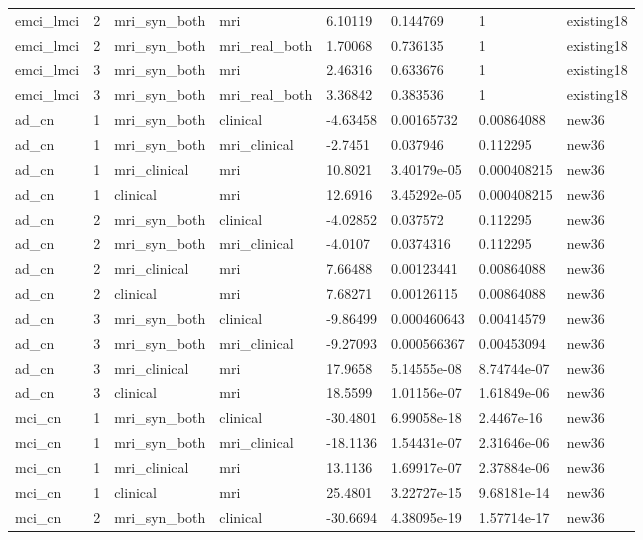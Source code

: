 \documentclass{article}
\begin{document}
\begin{landscape}
\begin{longtable}{llllllll}
emci\_lmci & 2 & mri\_syn\_both & mri & 6.10119 & 0.144769 & 1 & existing18 \\
emci\_lmci & 2 & mri\_syn\_both & mri\_real\_both & 1.70068 & 0.736135 & 1 & existing18 \\
emci\_lmci & 3 & mri\_syn\_both & mri & 2.46316 & 0.633676 & 1 & existing18 \\
emci\_lmci & 3 & mri\_syn\_both & mri\_real\_both & 3.36842 & 0.383536 & 1 & existing18 \\
ad\_cn & 1 & mri\_syn\_both & clinical & -4.63458 & 0.00165732 & 0.00864088 & new36 \\
ad\_cn & 1 & mri\_syn\_both & mri\_clinical & -2.7451 & 0.037946 & 0.112295 & new36 \\
ad\_cn & 1 & mri\_clinical & mri & 10.8021 & 3.40179e-05 & 0.000408215 & new36 \\
ad\_cn & 1 & clinical & mri & 12.6916 & 3.45292e-05 & 0.000408215 & new36 \\
ad\_cn & 2 & mri\_syn\_both & clinical & -4.02852 & 0.037572 & 0.112295 & new36 \\
ad\_cn & 2 & mri\_syn\_both & mri\_clinical & -4.0107 & 0.0374316 & 0.112295 & new36 \\
ad\_cn & 2 & mri\_clinical & mri & 7.66488 & 0.00123441 & 0.00864088 & new36 \\
ad\_cn & 2 & clinical & mri & 7.68271 & 0.00126115 & 0.00864088 & new36 \\
ad\_cn & 3 & mri\_syn\_both & clinical & -9.86499 & 0.000460643 & 0.00414579 & new36 \\
ad\_cn & 3 & mri\_syn\_both & mri\_clinical & -9.27093 & 0.000566367 & 0.00453094 & new36 \\
ad\_cn & 3 & mri\_clinical & mri & 17.9658 & 5.14555e-08 & 8.74744e-07 & new36 \\
ad\_cn & 3 & clinical & mri & 18.5599 & 1.01156e-07 & 1.61849e-06 & new36 \\
mci\_cn & 1 & mri\_syn\_both & clinical & -30.4801 & 6.99058e-18 & 2.4467e-16 & new36 \\
mci\_cn & 1 & mri\_syn\_both & mri\_clinical & -18.1136 & 1.54431e-07 & 2.31646e-06 & new36 \\
mci\_cn & 1 & mri\_clinical & mri & 13.1136 & 1.69917e-07 & 2.37884e-06 & new36 \\
mci\_cn & 1 & clinical & mri & 25.4801 & 3.22727e-15 & 9.68181e-14 & new36 \\
mci\_cn & 2 & mri\_syn\_both & clinical & -30.6694 & 4.38095e-19 & 1.57714e-17 & new36 \\

\end{longtable}
\end{landscape}
\end{document}
